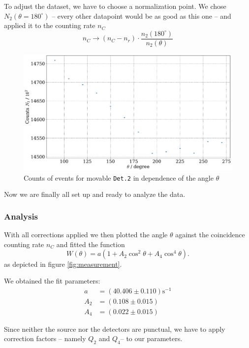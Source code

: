 \documentclass[11pt,a4paper,notitlepage]{scrartcl}
\begin{document}
To adjust the dataset, we have to choose a normalization point. We chose $N_2(\theta=180^\circ)$ -- every other datapoint would be as good as this one -- and applied it to the counting rate $n_C$
$$n_C\rightarrow (n_C-n_r)\cdot\frac{n_2(180^\circ)}{n_2(\theta)}$$
\begin{figure}
	\centering
	\includegraphics[width=\linewidth]{figs/main/count2.pdf}
	\caption{Counts of events for movable \texttt{Det.2} in dependence of the angle $\theta$}\label{fig:count2_angle}
\end{figure}

Now we are finally all set up and ready to analyze the data.

\subsubsection{Analysis}
With all corrections applied we then plotted the angle $\theta$ against the coincidence counting rate $n_C$ and fitted the function 
\begin{equation*}
	W(\theta)=a\left(1+A_2\cos^2\theta+A_4\cos^4\theta\right).
\end{equation*}
as depicted in figure \ref{fig:measurement}.

We obtained the fit parameters:
\begin{align*}
	a&=(40.406 \pm 0.110)\text{s}^{-1}\\
	A_2&=(0.108 \pm 0.015)\\
	A_4&=(0.022 \pm0.015)
\end{align*}

Since neither the source nor the detectors are punctual, we have to apply correction factors -- namely $Q_2$ and $Q_4$-- to our parameters.
\end{document}
